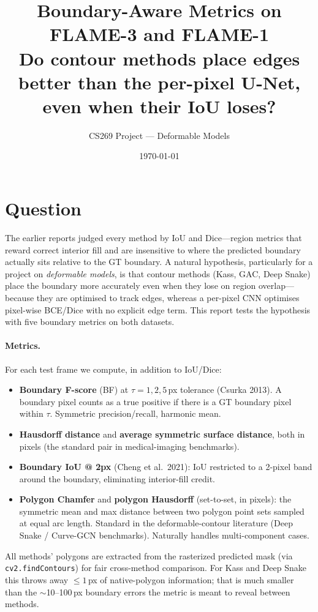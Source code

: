 \documentclass[10pt]{article}
\title{\vspace{-2.5em}Boundary-Aware Metrics on FLAME-3 and FLAME-1\\
\large Do contour methods place edges better than the per-pixel U-Net, even when their IoU loses?}
\author{CS269 Project --- Deformable Models}
\date{\today}
\begin{document}
\maketitle
\vspace{-1.5em}

\section{Question}

The earlier reports judged every method by IoU and Dice---region metrics that
reward correct interior fill and are insensitive to where the predicted
boundary actually sits relative to the GT boundary. A natural hypothesis,
particularly for a project on \emph{deformable models}, is that contour
methods (Kass, GAC, Deep Snake) place the boundary more accurately even when
they lose on region overlap---because they are optimised to track edges,
whereas a per-pixel CNN optimises pixel-wise BCE/Dice with no explicit edge
term. This report tests the hypothesis with five boundary metrics on both
datasets.

\paragraph{Metrics.} For each test frame we compute, in addition to IoU/Dice:
\begin{itemize}
\setlength\itemsep{0pt}
\item \textbf{Boundary F-score} (BF) at $\tau{=}1,2,5\,$px tolerance (Csurka 2013).
A boundary pixel counts as a true positive if there is a GT boundary pixel
within $\tau$. Symmetric precision/recall, harmonic mean.
\item \textbf{Hausdorff distance} and \textbf{average symmetric surface distance},
both in pixels (the standard pair in medical-imaging benchmarks).
\item \textbf{Boundary IoU @ 2px} (Cheng et al.\ 2021): IoU restricted to a
2-pixel band around the boundary, eliminating interior-fill credit.
\item \textbf{Polygon Chamfer} and \textbf{polygon Hausdorff} (set-to-set,
in pixels): the symmetric mean and max distance between two polygon point
sets sampled at equal arc length. Standard in the deformable-contour
literature (Deep Snake / Curve-GCN benchmarks). Naturally handles
multi-component cases.
\end{itemize}

All methods' polygons are extracted from the rasterized predicted mask (via
\texttt{cv2.findContours}) for fair cross-method comparison. For Kass and Deep
Snake this throws away $\le1\,$px of native-polygon information; that is much
smaller than the $\sim$10--100\,px boundary errors the metric is meant to
reveal between methods.
\end{document}
